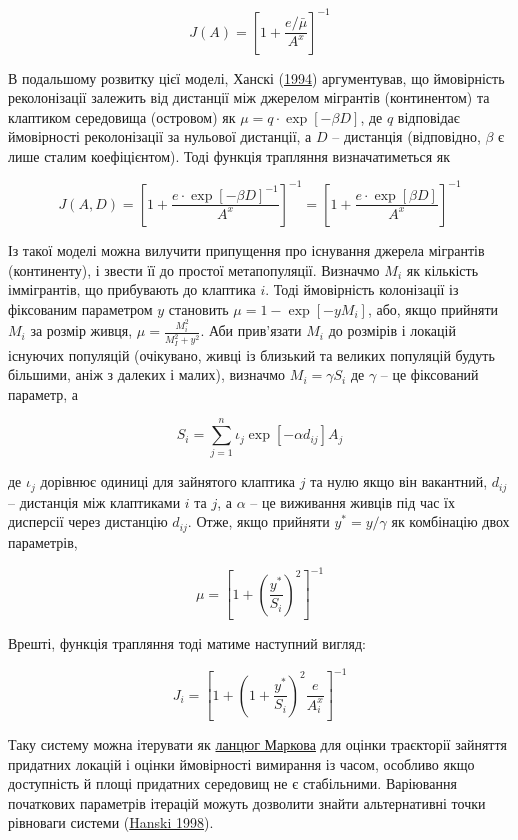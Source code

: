 \documentclass[
  11pt,
]{book}
\begin{document}
\[J(A) = \left[ 1 + \frac{e/\bar{\mu}}{A^x} \right]^{-1}\]

В подальшому розвитку цієї моделі, Ханскі (\href{https://10.1016/0169-5347(94)90177-5}{1994}) аргументував, що ймовірність реколонізації залежить від дистанції між джерелом мігрантів (континентом) та клаптиком середовища (островом) як \(\mu = q \cdot \exp[-\beta D]\), де \(q\) відповідає ймовірності реколонізації за нульової дистанції, а \(D\) -- дистанція (відповідно, \(\beta\) є лише сталим коефіцієнтом). Тоді функція трапляння визначатиметься як

\[J(A, D) = \left[ 1 + \frac{e \cdot \exp[-\beta D]^{-1}}{A^x} \right]^{-1} = \left[ 1 + \frac{e \cdot \exp[\beta D]}{A^x} \right]^{-1}\]

Із такої моделі можна вилучити припущення про існування джерела мігрантів (континенту), і звести її до простої метапопуляції. Визначмо \(M_i\) як кількість іммігрантів, що прибувають до клаптика \(i\). Тоді ймовірність колонізації із фіксованим параметром \(y\) становить \(\mu = 1 - \exp [-yM_i]\), або, якщо прийняти \(M_i\) за розмір живця, \(\mu = \frac{M_i^2}{M_I^2 + y^2}\). Аби прив'язати \(M_i\) до розмірів і локацій існуючих популяцій (очікувано, живці із близький та великих популяцій будуть більшими, аніж з далеких і малих), визначмо \(M_i = \gamma S_i\) де \(\gamma\) -- це фіксований параметр, а

\[S_i = \sum\limits_{j=1}^n \iota_j \exp[-\alpha d_{ij}] A_j\]

де \(\iota_j\) дорівнює одиниці для зайнятого клаптика \(j\) та нулю якщо він вакантний, \(d_{ij}\) -- дистанція між клаптиками \(i\) та \(j\), а \(\alpha\) -- це виживання живців під час їх дисперсії через дистанцію \(d_{ij}\). Отже, якщо прийняти \(y^* = y/\gamma\) як комбінацію двох параметрів,

\[\mu = \left[ 1+ \left( \frac{y^*}{S_i} \right)^2 \right]^{-1}\]

Врешті, функція трапляння тоді матиме наступний вигляд:

\[J_i = \left[ 1 + \left( 1+\frac{y^*}{S_i}\right)^2 \frac{e}{A_i^x}\right]^{-1}\]

Таку систему можна ітерувати як \hyperref[paradigms]{ланцюг Маркова} для оцінки траєкторії зайняття придатних локацій і оцінки ймовірності вимирання із часом, особливо якщо доступність й площі придатних середовищ не є стабільними. Варіювання початкових параметрів ітерацій можуть дозволити знайти альтернативні точки рівноваги системи (\href{https://www.nature.com/articles/23876}{Hanski 1998}).
\end{document}
